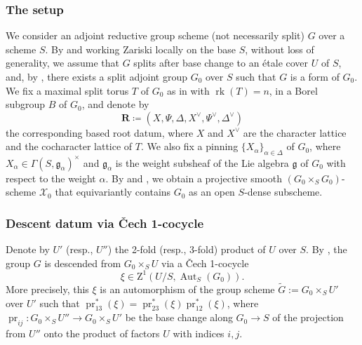 \documentclass[11pt, reqno]{amsart}
\theoremstyle{plain}
\theoremstyle{definition}
\DeclareMathOperator{\Aut}{\mathrm{Aut}}		%
\DeclareMathOperator{\pr}{pr}	%
\DeclareMathOperator{\rk}{rk}			%
\begin{document}
\subsubsection{The setup}
We consider an adjoint reductive group scheme (not necessarily split) $G$ over a scheme $S$. By \cite[exposé~XXII, corollaire~2.3]{SGA3III} and working Zariski locally on the base $S$, without loss of generality, we assume that $G$ splits after base change to an étale cover $U$ of $S$, and, by \cite[exposé~XXV, théorème~1.1]{SGA3III}, there exists a split adjoint group $G_0$ over $S$ such that $G$ is a form of $G_0$. We fix a maximal split torus $T$ of $G_0$ as in \cite[exposé~XXII, définition~1.13]{SGA3III} with $\rk(T)=n$, in a Borel subgroup $B$ of $G_0$, and denote by 
$$\mathbf{R}\coloneq (X,\Psi, \Delta, X^{\vee}, \Psi^{\vee}, \Delta^{\vee})$$
the corresponding based root datum, where $X$ and $X^{\vee}$ are the character lattice and the cocharacter lattice of $T$. We also fix a pinning $\{X_{\alpha}\}_{\alpha\in\Delta}$ of $G_0$, where $X_{\alpha}\in \Gamma(S, \mathfrak{g}_\alpha)^{\times}$ and $\mathfrak{g}_\alpha$ is the weight subsheaf of the Lie algebra $\mathfrak{g}$ of $G_0$ with respect to the weight $\alpha$. By  and , we obtain a projective smooth $(G_0\times_S G_0)$-scheme $\mathcal{X}_0$ that equivariantly contains $G_0$ as an open $S$-dense subscheme.


\subsubsection{Descent datum via \v{C}ech 1-cocycle}
Denote by $U'$ (resp., $U''$) the 2-fold (resp., 3-fold) product of $U$ over $S$. By \cite[Example~7.1.4]{redctiveconrad}, the group $G$ is descended from $G_0\times_S U$ via a \v{C}ech 1-cocycle $$\xi\in \text{Z}^1(U/ S,\Aut_S(G_0)).$$ More precisely, this $\xi$ is an automorphism of the group scheme $\widetilde{G}:=G_0\times_S U'$ over $U'$ such that $\pr_{13}^*(\xi)=\pr_{23}^*(\xi)\pr_{12}^*(\xi)$, where $\pr_{ij}:G_0\times_S U''\longrightarrow G_0\times_S U'$ be the base change along $G_0\longrightarrow S$ of the projection from $U''$ onto the product of factors $U$ with indices $i,j$. 
\end{document}
